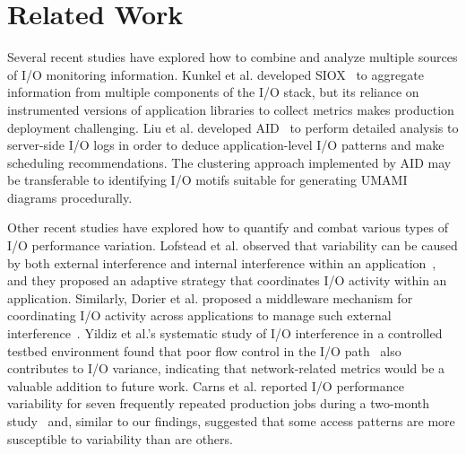 \section{Related Work} \label{sec:related}

Several recent studies have explored how to combine and analyze multiple sources of I/O monitoring information.
Kunkel et al. developed SIOX~\cite{Kunkel:2014:SAC:2769884.2769901} to aggregate information from multiple components of the I/O stack, 
but its reliance on instrumented versions of application libraries to collect metrics makes production deployment challenging.
Liu et al. developed AID~\cite{Liu2016} to perform detailed analysis to server-side I/O logs in order to deduce application-level I/O patterns and make scheduling recommendations.  The clustering approach implemented by AID may be transferable to identifying I/O motifs suitable for generating UMAMI diagrams procedurally.

Other recent studies have explored how to quantify and combat various types of I/O performance variation.
Lofstead et al. observed that variability can be caused by both external interference and internal interference within an application~\cite{Lofstead2010}, and they proposed an adaptive strategy that coordinates I/O activity within an application.
Similarly, Dorier et al. proposed a middleware mechanism for coordinating I/O activity across applications to manage such external interference~\cite{dorier2014calciom}.
Yildiz et al.'s systematic study of I/O interference in a controlled testbed environment found that poor flow control in the I/O path~\cite{Yildiz2016} also contributes to I/O variance, indicating that network-related metrics would be a valuable addition to future work.
Carns et al. reported I/O performance variability for seven frequently repeated production jobs during a two-month study~\cite{carns2011understanding} and, similar to our findings, suggested that some access patterns are more susceptible to variability than are others.
